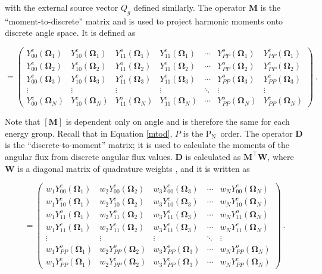\documentclass{article} %
\newcommand{\bo}{\mathbf\Omega}
\newcommand{\pn}{P$_\mathrm{N}$}
\newcommand{\ve}[1]{\ensuremath{\mathbf{#1}}}
\newcommand{\Ye}[2]{\ensuremath{Y^e_{#1}(\bo_#2)}}
\newcommand{\Yo}[2]{\ensuremath{Y^o_{#1}(\bo_#2)}}
\begin{document}
\noindent with the external source vector $Q_g$ defined similarly. The operator
$\ve{M}$ is the ``moment-to-discrete'' matrix and is 
used to project harmonic moments onto discrete angle space. It is defined as

\begin{equation}
[\ve{M}] = \begin{pmatrix}
\Ye{00}{1} & \Ye{10}{1} & \Yo{11}{1} & \Ye{11}{1} & \cdots & \Yo{PP}{1} & \Ye{PP}{1} \\
\Ye{00}{2} & \Ye{10}{2} & \Yo{11}{2} & \Ye{11}{2} & \cdots & \Yo{PP}{2} & \Ye{PP}{2} \\
\Ye{00}{3} & \Ye{10}{3} & \Yo{11}{3} & \Ye{11}{3} & \cdots & \Yo{PP}{3} & \Ye{PP}{3} \\
\vdots     & \vdots     & \vdots     & \vdots     & \ddots & \vdots     & \vdots     \\
\Ye{00}{N} & \Ye{10}{N} & \Yo{11}{N} & \Ye{11}{N} & \cdots & \Yo{PP}{N} & \Ye{PP}{N}
  \end{pmatrix}\:.
\label{mtod}
\end{equation}

\noindent Note that $[\ve{M}]$ is dependent only on angle and is therefore the
same for each energy group. Recall that in Equation \ref{mtod}, $P$ is the \pn\
order. The operator $\ve{D}$ is the ``discrete-to-moment''
matrix; it is used to calculate the moments of the angular flux from discrete
angular flux values. $\ve{D}$ is calculated as $\ve{M}^\top\ve{W}$, where
$\ve{W}$ is a diagonal matrix of quadrature weights \cite{exmm}, and it is
written as

\begin{equation}
  [\ve{D}] = \begin{pmatrix}
    w_1\Ye{00}{1} & w_2\Ye{00}{2} & w_3\Ye{00}{3} & \cdots & w_N\Ye{00}{N} \\ 
    w_1\Ye{10}{1} & w_2\Ye{10}{2} & w_3\Ye{10}{3} & \cdots & w_N\Ye{10}{N} \\
    w_1\Yo{11}{1} & w_2\Yo{11}{2} & w_3\Yo{11}{3} & \cdots & w_N\Yo{11}{N} \\
    w_1\Ye{11}{1} & w_2\Ye{11}{2} & w_3\Ye{11}{3} & \cdots & w_N\Ye{11}{N} \\
    \vdots        & \vdots        & \vdots        & \ddots & \vdots        \\
    w_1\Yo{PP}{1} & w_2\Yo{PP}{2} & w_3\Yo{PP}{3} & \cdots & w_N\Yo{PP}{N} \\
    w_1\Ye{PP}{1} & w_2\Ye{PP}{2} & w_3\Ye{PP}{3} & \cdots & w_N\Ye{PP}{N}
  \end{pmatrix}\:.
\end{equation}
\end{document}
